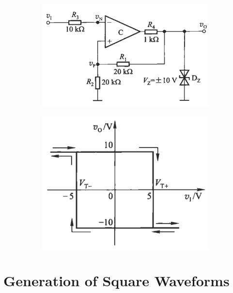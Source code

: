 \begin{figure}[H]
  \centering
  \begin{subfigure}{.45\textwidth}
    \centering
    \includegraphics[width=\linewidth]{figures/Trigger-1}
  \end{subfigure}
  \quad\quad\quad\quad
  \begin{subfigure}{.35\textwidth}
    \centering
    \includegraphics[width=\linewidth]{figures/Trigger-2}
  \end{subfigure}
\end{figure}

\section{Generation of Square Waveforms}

